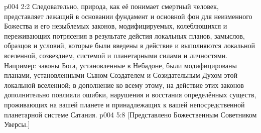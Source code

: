 \vs p004 2:2 Следовательно, природа, как её понимает смертный человек, представляет лежащий в основании фундамент и основной фон для неизменного Божества и его незыблемых законов, модифицируемых, колеблющихся и переживающих потрясения в результате дейстия локальных планов, замыслов, образцов и условий, которые были введены в действие и выполняются локальной вселенной, созвездием, системой и планетарными силами и личностями. Например: законы Бога, установленные в Небадоне, были модифицированы планами, установленными Сыном Создателем и Созидательным Духом этой локальной вселенной; в дополнение ко всему этому, на действие этих законов дополнительно повлияли ошибки, нарушения и восстания определённых существ, проживающих на вашей планете и принадлежащих к вашей непосредственной планетарной системе Сатания.
\vsetoff
\vs p004 5:8 [Представлено Божественным Советником Уверсы.]
\quizlink
